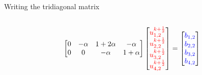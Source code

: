 \documentclass{beamer}
\begin{document}
\begin{frame}{Writing the tridiagonal matrix}
\begin{columns}
\begin{column}{0.7\textwidth}
{\begin{align*}
\begin{bmatrix}
                        0 & -\alpha & 1 + 2\alpha & -\alpha \\
                         0 & 0 & -\alpha & 1 + \alpha  \\
                    \end{bmatrix}
                    \begin{bmatrix}
                        \textcolor{red}{u_{1,2}^{k+\frac{1}{2}}} \\
                        \textcolor{red}{u_{2,2}^{k+\frac{1}{2}}} \\
                        \textcolor{red}{u_{3,2}^{k+\frac{1}{2}}} \\
                        \textcolor{red}{u_{4,2}^{k+\frac{1}{2}}} \\
                    \end{bmatrix}
                    =
                    \begin{bmatrix}
                        \textcolor{blue}{b_{1,2}} \\
                        \textcolor{blue}{b_{2,2}} \\
                        \textcolor{blue}{b_{3,2}} \\
                        \textcolor{blue}{b_{4,2}} \\
                    \end{bmatrix}
                \end{align*}
                }
                \vspace{-0.5cm}
\end{column}
\end{columns}
\end{frame}
\end{document}
